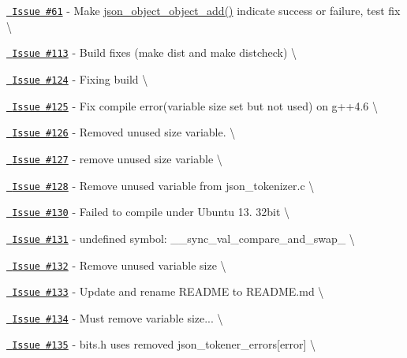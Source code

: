 \begin{DoxyItemize}
\item \href{https://github.com/json-c/json-c/issues/61}{\texttt{ Issue \#61}} -\/ Make \mbox{\hyperlink{json__object_8h_a27bd808a022251059a43f1f6370441cd}{json\+\_\+object\+\_\+object\+\_\+add()}} indicate success or failure, test fix \textbackslash{}
\item \href{https://github.com/json-c/json-c/issues/113}{\texttt{ Issue \#113}} -\/ Build fixes (make dist and make distcheck) \textbackslash{}
\item \href{https://github.com/json-c/json-c/issues/124}{\texttt{ Issue \#124}} -\/ Fixing build \textbackslash{}
\item \href{https://github.com/json-c/json-c/issues/125}{\texttt{ Issue \#125}} -\/ Fix compile error(variable size set but not used) on g++4.6 \textbackslash{}
\item \href{https://github.com/json-c/json-c/issues/126}{\texttt{ Issue \#126}} -\/ Removed unused size variable. \textbackslash{}
\item \href{https://github.com/json-c/json-c/issues/127}{\texttt{ Issue \#127}} -\/ remove unused {\ttfamily size} variable \textbackslash{}
\item \href{https://github.com/json-c/json-c/issues/128}{\texttt{ Issue \#128}} -\/ Remove unused variable from json\+\_\+tokenizer.\+c \textbackslash{}
\item \href{https://github.com/json-c/json-c/issues/130}{\texttt{ Issue \#130}} -\/ Failed to compile under Ubuntu 13. 32bit \textbackslash{}
\item \href{https://github.com/json-c/json-c/issues/131}{\texttt{ Issue \#131}} -\/ undefined symbol\+: \+\_\+\+\_\+sync\+\_\+val\+\_\+compare\+\_\+and\+\_\+swap\+\_ \textbackslash{}
\item \href{https://github.com/json-c/json-c/issues/132}{\texttt{ Issue \#132}} -\/ Remove unused variable \textquotesingle{}size\textquotesingle{} \textbackslash{}
\item \href{https://github.com/json-c/json-c/issues/133}{\texttt{ Issue \#133}} -\/ Update and rename README to README.\+md \textbackslash{}
\item \href{https://github.com/json-c/json-c/issues/134}{\texttt{ Issue \#134}} -\/ Must remove variable size... \textbackslash{}
\item \href{https://github.com/json-c/json-c/issues/135}{\texttt{ Issue \#135}} -\/ bits.\+h uses removed json\+\_\+tokener\+\_\+errors\mbox{[}error\mbox{]} \textbackslash{}

\end{DoxyItemize}
